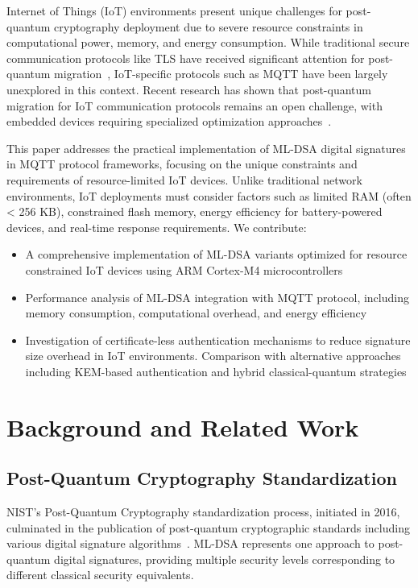 \documentclass[journal=tches,final]{iacrtrans}
\begin{document}
Internet of Things (IoT) environments present unique challenges for post-quantum cryptography deployment due to severe resource constraints in computational power, memory, and energy consumption. While traditional secure communication protocols like TLS have received significant attention for post-quantum migration~\cite{Kampanakis2020, Sikeridis2020}, IoT-specific protocols such as MQTT have been largely unexplored in this context. Recent research has shown that post-quantum migration for IoT communication protocols remains an open challenge, with embedded devices requiring specialized optimization approaches~\cite{KEM-MQTT2025}.

This paper addresses the practical implementation of ML-DSA digital signatures in MQTT protocol frameworks, focusing on the unique constraints and requirements of resource-limited IoT devices. Unlike traditional network environments, IoT deployments must consider factors such as limited RAM (often < 256 KB), constrained flash memory, energy efficiency for battery-powered devices, and real-time response requirements. We contribute:

\begin{itemize}
    \item A comprehensive implementation of ML-DSA variants optimized for resource constrained IoT devices using ARM Cortex-M4 microcontrollers
    \item Performance analysis of ML-DSA integration with MQTT protocol, including memory consumption, computational overhead, and energy efficiency
    \item Investigation of certificate-less authentication mechanisms to reduce signature size overhead in IoT environments. Comparison with alternative approaches including KEM-based authentication and hybrid classical-quantum strategies
\end{itemize}


\section{Background and Related Work}

\subsection{Post-Quantum Cryptography Standardization}

NIST's Post-Quantum Cryptography standardization process, initiated in 2016, culminated in the publication of post-quantum cryptographic standards including various digital signature algorithms~\cite{NIST-PQC-Standards}. ML-DSA represents one approach to post-quantum digital signatures, providing multiple security levels corresponding to different classical security equivalents.
\end{document}
